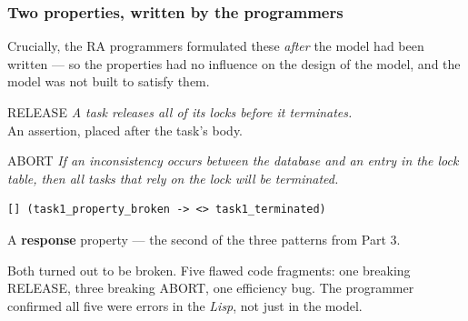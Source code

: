 \begin{frame}[fragile]
  \frametitle{Two properties, written by the programmers} \small

Crucially, the RA programmers formulated these {\em after} the \promelaname{}
model had been written --- so the properties had no influence on the design of the
model, and the model was not built to satisfy them.

\vspace{0.25cm}

\begin{block}{RELEASE}\small
{\em A task releases all of its locks before it terminates.} \\
An assertion, placed after the task's body.
\end{block}

\pause

\begin{block}{ABORT}\small
{\em If an inconsistency occurs between the database and an entry in the lock
table, then all tasks that rely on the lock will be terminated.}
\begin{lstlisting}[language=promela]
[] (task1_property_broken -> <> task1_terminated)
\end{lstlisting}
A {\bf response} property --- the second of the three patterns from Part 3.
\end{block}

\pause
\vspace{0.2cm}

Both turned out to be broken. Five flawed code fragments: one breaking RELEASE,
three breaking ABORT, one efficiency bug. The programmer confirmed all five were
errors in the {\em Lisp}, not just in the model.

\end{frame}

